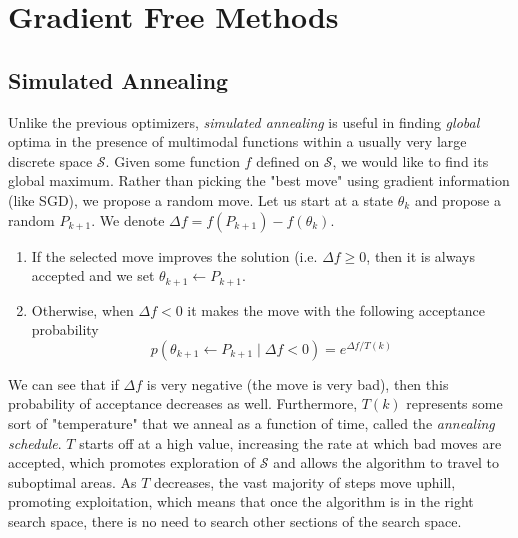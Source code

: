 \section{Gradient Free Methods}

\subsection{Simulated Annealing}

  Unlike the previous optimizers, \textit{simulated annealing} is useful in finding \textit{global} optima in the presence of multimodal functions within a usually very large discrete space $\mathcal{S}$. Given some function $f$ defined on $\mathcal{S}$, we would like to find its global maximum. Rather than picking the "best move" using gradient information (like SGD), we propose a random move. Let us start at a state $\theta_k$ and propose a random $P_{k+1}$. We denote $\Delta f = f(P_{k+1}) - f(\theta_k)$. 
  \begin{enumerate}
      \item If the selected move improves the solution (i.e. $\Delta f \geq 0$, then it is always accepted and we set $\theta_{k+1} \gets P_{k+1}$. 
      \item Otherwise, when $\Delta f < 0$ it makes the move with the following acceptance probability 
      \begin{equation}
        p(\theta_{k+1} \gets P_{k+1} \mid \Delta f < 0) = e^{\Delta f / T(k)}
      \end{equation}
  \end{enumerate}
  We can see that if $\Delta f$ is very negative (the move is very bad), then this probability of acceptance decreases as well. Furthermore, $T(k)$ represents some sort of "temperature" that we anneal as a function of time, called the \textit{annealing schedule}. $T$ starts off at a high value, increasing the rate at which bad moves are accepted, which promotes exploration of $\mathcal{S}$ and allows the algorithm to travel to suboptimal areas. As $T$ decreases, the vast majority of steps move uphill, promoting exploitation, which means that once the algorithm is in the right search space, there is no need to search other sections of the search space. 

